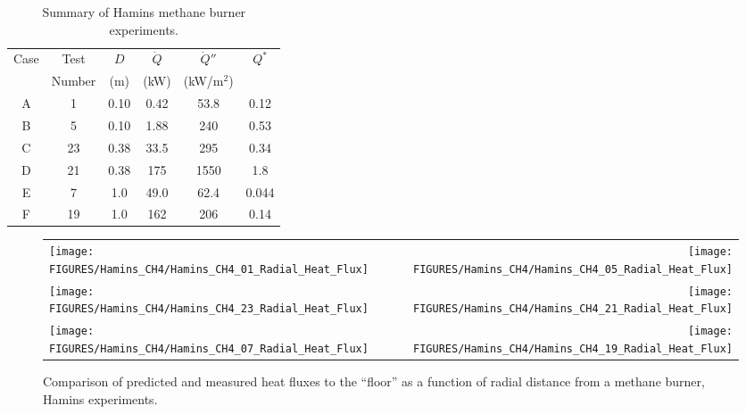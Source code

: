 \begin{table}[ht]
\caption{Summary of Hamins methane burner experiments. }
\begin{center}
\begin{tabular}{|c|c|c|c|c|c|}
\hline
Case     & Test     & $D$  & $\dot{Q}$   &  $\dot{Q}''$   & $Q^*$   \\
         & Number   & (m)  & (kW)        &  (kW/m$^2$)    &         \\ \hline \hline
A        & 1        & 0.10 & 0.42        &  53.8          & 0.12    \\ \hline
B        & 5        & 0.10 & 1.88        &  240           & 0.53    \\ \hline
C        & 23       & 0.38 & 33.5        &  295           & 0.34    \\ \hline
D        & 21       & 0.38 & 175         &  1550          & 1.8     \\ \hline
E        & 7        & 1.0  & 49.0        &  62.4          & 0.044   \\ \hline
F        & 19       & 1.0  & 162         &  206           & 0.14    \\ \hline
\end{tabular}
\end{center}
\label{Hamins_Table}
\end{table}

\begin{figure}[p]
\begin{tabular*}{\textwidth}{l@{\extracolsep{\fill}}r}
\texttt{[image: FIGURES/Hamins\_CH4/Hamins\_CH4\_01\_Radial\_Heat\_Flux]} &
\texttt{[image: FIGURES/Hamins\_CH4/Hamins\_CH4\_05\_Radial\_Heat\_Flux]} \\
\texttt{[image: FIGURES/Hamins\_CH4/Hamins\_CH4\_23\_Radial\_Heat\_Flux]} &
\texttt{[image: FIGURES/Hamins\_CH4/Hamins\_CH4\_21\_Radial\_Heat\_Flux]} \\
\texttt{[image: FIGURES/Hamins\_CH4/Hamins\_CH4\_07\_Radial\_Heat\_Flux]} &
\texttt{[image: FIGURES/Hamins\_CH4/Hamins\_CH4\_19\_Radial\_Heat\_Flux]}
\end{tabular*}
\label{Hamins_CH4_Radial}
\caption[Radial heat flux predictions, Hamins methane burner experiments.]
{Comparison of predicted and measured heat fluxes to the ``floor'' as a function of radial distance from a methane burner, Hamins experiments.}
\end{figure}


